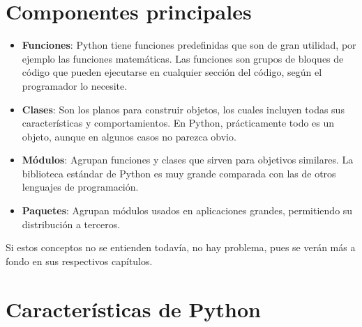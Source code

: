 \section{Componentes principales}

\begin{itemize}
  \item \textbf{Funciones}: Python tiene funciones predefinidas que son de gran utilidad, por ejemplo las funciones matemáticas. Las funciones son grupos de bloques de código que pueden ejecutarse en cualquier sección del código, según el programador lo necesite.
  
  \item \textbf{Clases}: Son los planos para construir objetos, los cuales incluyen todas sus características y comportamientos. En Python, prácticamente todo es un objeto, aunque en algunos casos no parezca obvio.
  
  \item \textbf{Módulos}: Agrupan funciones y clases que sirven para objetivos similares. La biblioteca estándar de Python es muy grande comparada con las de otros lenguajes de programación.
  
  \item \textbf{Paquetes}: Agrupan módulos usados en aplicaciones grandes, permitiendo su distribución a terceros.
  
\end{itemize}

Si estos conceptos no se entienden todavía, no hay problema, pues se verán más a fondo en sus respectivos capítulos.

\section{Características de Python}

